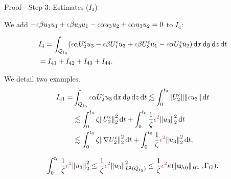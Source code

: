 \documentclass{beamer}
\newcommand*\diff{\mathop{}\!\mathrm{d}}
\begin{document}
\begin{frame}{Proof - Step 3: Estimates ($I_4$)}

We add $ - \textcolor{jasper}{\epsilon} \beta u_3 u_1 +  \textcolor{jasper}{\epsilon} \beta u_3 u_1 - \textcolor{jasper}{\epsilon} \alpha u_3 u_2 + \textcolor{jasper}{\epsilon} \alpha u_3 u_2 = 0 $ to $I_4:$ 

\begin{equation}\nonumber
\begin{split}
& I_4 = \int_{Q_{t_0}}  ( \textcolor{jasper}{\epsilon} \alpha U_2^\epsilon u_3 - \textcolor{jasper}{\epsilon} \beta U_1^\epsilon u_3 + \textcolor{jasper}{\epsilon} \beta U_3^\epsilon u_1 - \textcolor{jasper}{\epsilon} \alpha U_3^\epsilon u_2 ) \diff x \diff y \diff z \diff t \\
& = I_{41} + I_{42} + I_{43} + I_{44}.
\end{split}
\end{equation}

We detail two examples.
\begin{equation}\nonumber
\begin{split}
I_{41} = & \int_{Q_{t_0}} \textcolor{jasper}{\epsilon} \alpha U_2^\epsilon u_3 \diff x \diff y \diff z \diff t \lesssim \int_0^{t_0} \norm{U_2^\epsilon} \norm{\textcolor{jasper}{\epsilon} u_3} \diff t \\
& \lesssim \int_0^{t_0} \zeta \norm{U_2^\epsilon}^2_2 \diff t + \int_0^{t_0} \frac{1}{\zeta} \textcolor{jasper}{\epsilon^2} \norm{u_3}^2_2 \diff t \\
& \lesssim \int_0^{t_0} \zeta \norm{\nabla U_2^\epsilon}^2_2 \diff t + \int_0^{t_0} \frac{1}{\zeta} \textcolor{jasper}{\epsilon^2} \norm{u_3}^2_2 \diff t,
\end{split}
\end{equation}
      
$$\int_0^{t_0} \frac{1}{\zeta} \textcolor{jasper}{\epsilon^2} \norm{u_3}^2_2 \leq \frac{1}{\zeta} \textcolor{jasper}{\epsilon^2} \norm{u_3}^2_{L^2(Q_{t_0})} \leq \frac{1}{\zeta} \textcolor{jasper}{\epsilon^2} \kappa (\norm{{\mathbf{u}_h}_0}_{H^1}, \Gamma_G).$$

\end{frame}
\end{document}
